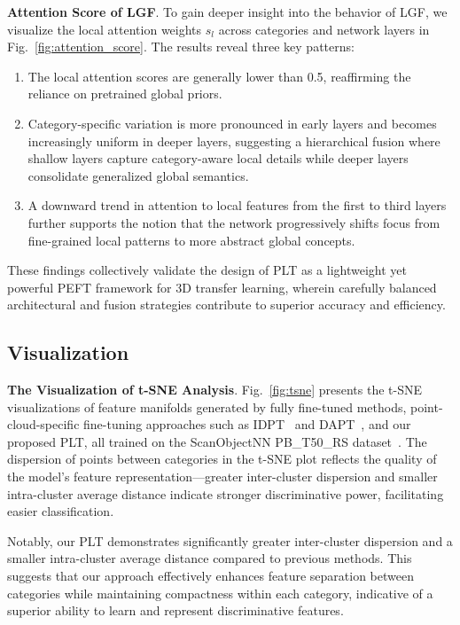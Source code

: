 \textbf{Attention Score of LGF}. To gain deeper insight into the behavior of LGF, we visualize the local attention weights $s_l$ across categories and network layers in Fig.~\ref{fig:attention_score}. The results reveal three key patterns:

\begin{enumerate}
    \item The local attention scores are generally lower than 0.5, reaffirming the reliance on pretrained global priors.
    \item Category-specific variation is more pronounced in early layers and becomes increasingly uniform in deeper layers, suggesting a hierarchical fusion where shallow layers capture category-aware local details while deeper layers consolidate generalized global semantics.
    \item A downward trend in attention to local features from the first to third layers further supports the notion that the network progressively shifts focus from fine-grained local patterns to more abstract global concepts.
\end{enumerate}

These findings collectively validate the design of PLT as a lightweight yet powerful PEFT framework for 3D transfer learning, wherein carefully balanced architectural and fusion strategies contribute to superior accuracy and efficiency.





\subsection{Visualization}

\textbf{The Visualization of t-SNE Analysis}. Fig.~\ref{fig:tsne} presents the t-SNE~\cite{van2008visualizing} visualizations of feature manifolds generated by fully fine-tuned methods, point-cloud-specific fine-tuning approaches such as IDPT~\cite{zha2023instance} and DAPT~\cite{zhou2024dynamic}, and our proposed PLT, all trained on the ScanObjectNN PB\_T50\_RS dataset~\cite{uy2019revisiting}. The dispersion of points between categories in the t-SNE plot reflects the quality of the model's feature representation—greater inter-cluster dispersion and smaller intra-cluster average distance indicate stronger discriminative power, facilitating easier classification.

Notably, our PLT demonstrates significantly greater inter-cluster dispersion and a smaller intra-cluster average distance compared to previous methods. This suggests that our approach effectively enhances feature separation between categories while maintaining compactness within each category, indicative of a superior ability to learn and represent discriminative features.

